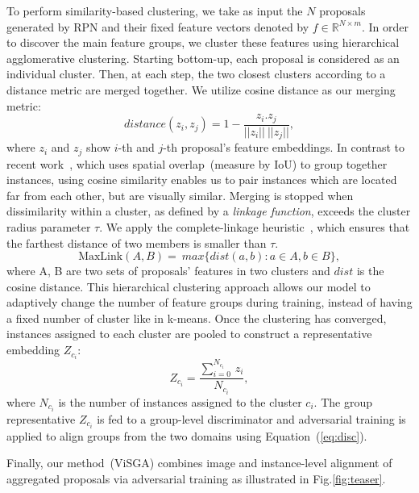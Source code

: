 \documentclass[10pt,twocolumn,letterpaper]{article}
\DeclareRobustCommand{\eqnref}[1]{Equation~(\ref{#1})}
\def\ourda{ViSGA\xspace}
\begin{document}
 To perform similarity-based clustering, we take as input the $N$ proposals generated by RPN and their fixed feature vectors denoted by $f\in \mathbb{R}^{N \times m}$.
In order to discover the main feature groups, we cluster these features using  hierarchical agglomerative clustering. Starting bottom-up, each proposal is considered as an individual cluster. Then, at each step, the two closest clusters according to a distance metric are merged together. We utilize cosine distance as our merging metric:
\begin{equation} \label{eq:metric}
distance (z_{i} , z_{j}) =1 - \frac{z_{i} . z_{j}}{||z_{i}|| \ ||z_{j}||}, 
\end{equation}
\noindent where $z_{i}$ and $z_{j}$ show $i$-th and $j$-th proposal's feature embeddings. In contrast to recent work~\cite{GPA}, which uses spatial overlap~(measure by IoU) to group together instances, using cosine similarity enables us to pair instances which are located far from each other, but are visually similar. Merging is stopped when dissimilarity within a cluster, as defined by a \emph{linkage function}, exceeds the cluster radius parameter $\tau$. We apply the complete-linkage heuristic~\cite{defays1977efficient}, which ensures that the farthest distance of two members is smaller than $\tau$.
\begin{equation} \label{eq:linkage}
\text{MaxLink}(A,B) = \ max \{ dist(a,b) : a\in A, b\in B\},
\end{equation}
\noindent where A, B are two sets of proposals' features in two clusters and $dist$ is the cosine distance. 
This hierarchical clustering approach allows our model to adaptively change the number of feature groups during training, instead of having a fixed number of cluster like in k-means. 
Once the clustering has converged, instances assigned to each cluster are pooled to construct a representative embedding $Z_{c_i}$:
\begin{equation} 
Z_{c_i} = \frac{\sum_{i=0}^{N_{c_i}} \, z_i}{N_{c_i}},
\end{equation}
\noindent where $N_{c_i}$ is the number of instances assigned to the cluster $c_i$. 
The group representative $Z_{c_i}$ is fed to a group-level discriminator and adversarial training is applied to align groups from the two domains using \eqnref{eq:disc}.

Finally, our method~(\ourda) combines image and instance-level alignment of aggregated proposals via adversarial training as illustrated in Fig.\ref{fig:teaser}.
 
\end{document}
